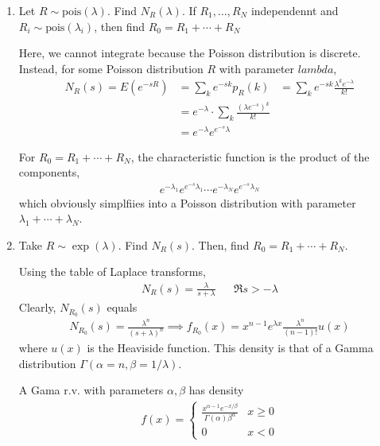 \begin{enumerate}
    \item Let $R \sim \text{pois}(\lambda)$. Find $N_R(\lambda)$. If $R_1, \ldots, R_N$ independennt and $R_i \sim \text{pois}(\lambda_i)$, then find $R_0 = R_1 + \cdots + R_N$
    \begin{solution}
        Here, we cannot integrate because the Poisson distribution is discrete. Instead, for some Poisson distribution $R$ with parameter $lambda$,
        \begin{align}
            N_R(s) = E(e^{-sR}) &= \sum_k e^{-sk} p_R(k)
            &= \sum_k e^{-sk} \frac{\lambda^k e^{-\lambda}}{k!}\\
            &= e^{-\lambda} \cdot \sum_k \frac{(\lambda e^{-s})^k}{k!}\\
            &= e^{-\lambda} e^{e^{-s}\lambda}
        \end{align}
    \end{solution}
    For $R_0 = R_1 + \cdots + R_N$, the characteristic function is the product of the components,
    \begin{align}
        e^{-\lambda_1} e^{e^{-s}\lambda_1} \cdots e^{-\lambda_N} e^{e^{-s}\lambda_N} 
    \end{align}
    which obviously simplfiies into a Poisson distribution with parameter $\lambda_1 + \cdots + \lambda_N$.

    \item Take $R \sim \exp(\lambda)$. Find $N_R(s)$. Then, find $R_0 = R_1 + \cdots + R_N$.
    \begin{solution}
        Using the table of Laplace transforms,
        \begin{align}
            N_R(s) = \frac{\lambda}{s+\lambda} && \Re s > -\lambda
        \end{align}
        Clearly, $N_{R_0}(s)$ equals
        \begin{align}
            N_{R_0}(s) = \frac{\lambda^n}{(s+\lambda)^n} \implies f_{R_0}(x) = x^{n-1} e^{\lambda x} \frac{\lambda^n}{(n-1)!} u(x)
        \end{align}
        where $u(x)$ is the Heaviside function. This density is that of a Gamma distribution $\Gamma(\alpha = n, \beta = 1/\lambda)$.
    \end{solution}

    \begin{definition}
        A Gama r.v. with parameters $\alpha, \beta$ has density
        \begin{align}
            f(x) = \begin{cases}
                \frac{x^{\alpha-1} e^{-x/\beta}}{\Gamma(\alpha) \beta^\alpha} & x \ge 0\\
                0 & x < 0
            \end{cases}
        \end{align}
    \end{definition}

\end{enumerate}





